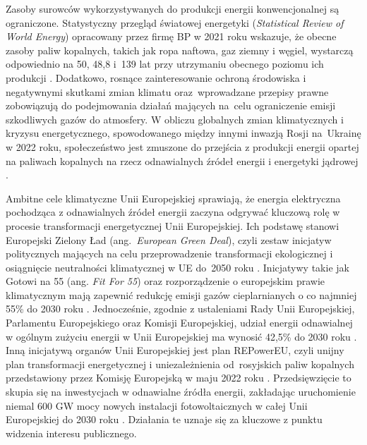 \documentclass{amuthesis}
\begin{document}
Zasoby surowców wykorzystywanych do produkcji energii konwencjonalnej są
ograniczone. Statystyczny przegląd światowej energetyki
(\emph{Statistical Review of World Energy}) opracowany przez firmę BP w
2021 roku wskazuje, że obecne zasoby paliw kopalnych, takich jak ropa
naftowa, gaz ziemny i węgiel, wystarczą odpowiednio na 50, 48,8 i~139
lat przy utrzymaniu obecnego poziomu ich produkcji
\autocite{bp_2021_world_energy}. Dodatkowo, rosnące zainteresowanie
ochroną środowiska i negatywnymi skutkami zmian klimatu oraz~wprowadzane
przepisy prawne zobowiązują do podejmowania działań mających na~celu
ograniczenie emisji szkodliwych gazów do atmosfery. W obliczu globalnych
zmian klimatycznych i kryzysu energetycznego, spowodowanego między
innymi inwazją Rosji na~Ukrainę w 2022 roku, społeczeństwo jest zmuszone
do przejścia z produkcji energii opartej na paliwach kopalnych na rzecz
odnawialnych źródeł energii i energetyki jądrowej
\autocite{iea2021,iea2022}.

Ambitne cele klimatyczne Unii Europejskiej sprawiają, że energia
elektryczna pochodząca z odnawialnych źródeł energii zaczyna odgrywać
kluczową rolę w procesie transformacji energetycznej Unii Europejskiej.
Ich podstawę stanowi Europejski Zielony Ład (ang.~\emph{European Green
Deal}), czyli zestaw inicjatyw politycznych mających na celu
przeprowadzenie transformacji ekologicznej i osiągnięcie neutralności
klimatycznej w UE do~2050 roku \autocite{european_green_deal}.
Inicjatywy takie jak Gotowi na 55 (ang. \emph{Fit For 55}) oraz
rozporządzenie o europejskim prawie klimatycznym mają zapewnić redukcję
emisji gazów cieplarnianych o co najmniej 55\% do 2030 roku
\autocite{european_green_deal}. Jednocześnie, zgodnie z ustaleniami Rady
Unii Europejskiej, Parlamentu Europejskiego oraz Komisji Europejskiej,
udział energii odnawialnej w ogólnym zużyciu energii w Unii Europejskiej
ma wynosić 42,5\% do 2030 roku \autocite{renewable_energy_eu}. Inną
inicjatywą organów Unii Europejskiej jest plan REPowerEU, czyli unijny
plan transformacji energetycznej i uniezależnienia od~rosyjskich paliw
kopalnych przedstawiony przez Komisję Europejską w maju 2022 roku
\autocite{repowerEU2022}. Przedsięwzięcie to skupia się na inwestycjach
w odnawialne źródła energii, zakładając uruchomienie niemal 600 GW mocy
nowych instalacji fotowoltaicznych w całej Unii Europejskiej do 2030
roku \autocite{repowerEU2022}. Działania te uznaje się za kluczowe z
punktu widzenia interesu publicznego.
\end{document}
